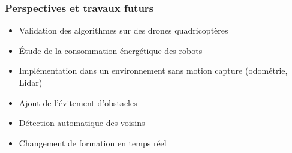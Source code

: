 
\begin{frame}
    \frametitle{Perspectives et travaux futurs}
    \begin{itemize}
        \item Validation des algorithmes sur des drones quadricoptères
        \item Étude de la consommation énergétique des robots
        \item Implémentation dans un environnement sans motion capture (odométrie, Lidar)
        \item Ajout de l'évitement d'obstacles
        \item Détection automatique des voisins
        \item Changement de formation en temps réel
    \end{itemize}
\end{frame}